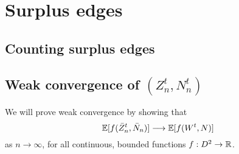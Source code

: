 
\chapter{Surplus edges}

\section{Counting surplus edges}

\begin{figure}
	
\end{figure}

\section{Weak convergence of $(Z^t_n, N^t_n)$}


We will prove weak convergence by showing that
\begin{equation}
\mathbb{E}[ f(\bar{Z}^t_n, \bar{N}_n) ] \longrightarrow \mathbb{E}[ f(W^t, N) ]
\end{equation}
as $n \rightarrow \infty$, 
for all continuous, bounded functions 
$f: D^2 \rightarrow \mathbb{R}$.